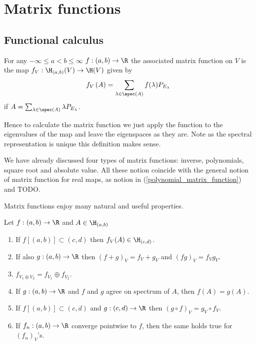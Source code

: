 \chapter{Matrix functions}

\section{Functional calculus}

\begin{maar}
	For any $-\infty \leq a < b \leq \infty$ $f : (a, b) \to \R$ the associated matrix function on $V$ is the map $f_{V} : \H_{(a, b)}(V) \to \H(V)$ given by
	\[
		f_{V}\left(A\right) = \sum_{\lambda \in \spec(A)} f(\lambda) P_{E_{\lambda}}
	\]
	if $A = \sum_{\lambda \in \spec(A)} \lambda P_{E_{\lambda}}$.
\end{maar}
Hence to calculate the matrix function we just apply the function to the eigenvalues of the map and leave the eigenspaces as they are. Note as the spectral representation is unique this definition makes sense.

We have already discussed four types of matrix functions: inverse, polynomials, square root and absolute value. All these notion coincide with the general notion of matrix function for real maps, as notion in (\ref{polynomial_matrix_function}) and TODO.

Matrix functions enjoy many natural and useful properties.

\begin{prop}\label{basic_matrix}
	Let $f : (a,b) \to \R$ and $A \in \H_{(a, b)}$
	\begin{enumerate}
		\item If $f[(a, b)] \subset (c, d)$ then $f_{V}(A) \in \H_{(c, d)}$.
		\item If also $g : (a, b) \to \R$ then $(f + g)_{V} = f_{V} + g_{V}$ and $(fg)_{V} = f_{V}g_{V}$.
		\item $f_{V_{1} \oplus V_{2}} = f_{V_{1}} \oplus f_{V_{2}}$.
		\item If $g : (a, b) \to \R$ and $f$ and $g$ agree on spectrum of $A$, then $f(A) = g(A)$.
		\item If $f[(a, b)] \subset (c, d)$ and $g : (c, d) \to \R$ then $(g \circ f)_{V} = g_{V} \circ f_{V}$.
		\item If $f_{n} : (a, b) \to \R$ converge pointwise to $f$, then the same holds true for $(f_{n})_{V}$'s.
	\end{enumerate}
\end{prop}

